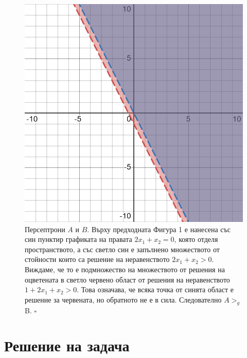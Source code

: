 \documentclass[12pt]{article}
\begin{document}
	\newpage
	\begin{figure}[H]
		\centering
		\includegraphics[width=140mm]{desmos-graph(1).png} 
		\caption{Персептрони $A$ и $B$. Върху предходната Фигура 1 е нанесена със син пунктир графиката на правата $2x_{1} + x_{2} = 0$, която отделя пространството, а със светло син е запълнено множеството от стойности които са решение на неравенството $2x_{1} + x_{2} > 0$. Виждаме, че то е подмножество на множеството от решения на оцветената в светло червено област от решения на неравенството $1 + 2x_{1} + x_{2} > 0$. Това означава, че всяка точка от синята област е решение за червената, но обратното не е в сила. Следователно $A >_{g}$ B. $\square$}
	\end{figure}

		
	\newpage
	
	\section{Решение на задача }
	
\end{document}
